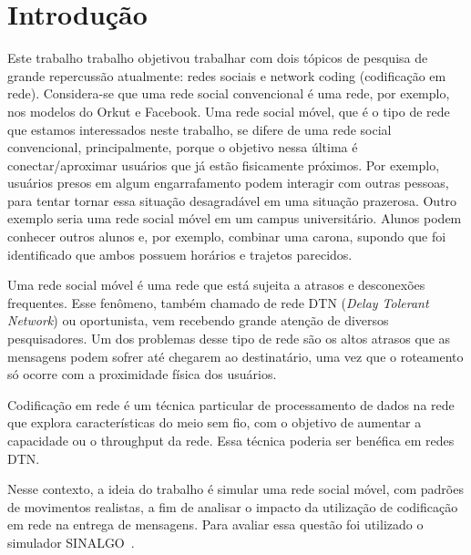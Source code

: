 \section{Introdução}

Este trabalho trabalho objetivou trabalhar com dois tópicos de pesquisa
de grande repercussão atualmente: redes sociais e network coding
(codificação em rede). Considera-se que uma rede social convencional é
uma rede, por exemplo, nos modelos do Orkut e Facebook.  Uma rede social
móvel, que é o tipo de rede que estamos interessados neste trabalho, se
difere de uma rede social convencional, principalmente, porque o
objetivo nessa última é conectar/aproximar usuários que já estão
fisicamente próximos. Por exemplo, usuários presos em algum
engarrafamento podem interagir com outras pessoas, para tentar tornar
essa situação desagradável em uma situação prazerosa. Outro exemplo
seria uma rede social móvel em um campus universitário. Alunos podem
conhecer outros alunos e, por exemplo, combinar uma carona, supondo que
foi identificado que ambos possuem horários e trajetos parecidos.

Uma rede social móvel é uma rede que está sujeita a atrasos e
desconexões frequentes. Esse fenômeno, também chamado de rede DTN
(\textit{Delay Tolerant Network}) ou
oportunista, vem recebendo grande atenção de diversos pesquisadores. Um
dos problemas desse tipo de rede são os altos atrasos que as mensagens
podem sofrer até chegarem ao destinatário, uma vez que o roteamento só
ocorre com a proximidade física dos usuários.

Codificação em rede é um técnica particular de processamento de dados na
rede que explora características do meio sem fio, com o objetivo de
aumentar a capacidade ou o throughput da rede. Essa técnica poderia ser
benéfica em redes DTN.

Nesse contexto, a ideia do trabalho é simular uma rede social móvel, com
padrões de movimentos realistas, a fim de analisar o impacto da
utilização de codificação em rede na entrega de mensagens. Para avaliar
essa questão foi utilizado o simulador SINALGO~\cite{sinalgo}. 
